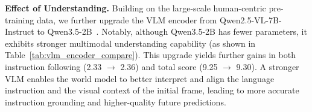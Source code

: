 \documentclass{llmxive}
\begin{document}
\textbf{Effect of Understanding.} Building on the large-scale human-centric pre-training data, we further upgrade the VLM encoder from Qwen2.5-VL-7B-Instruct to Qwen3.5-2B~\cite{qwen3.5}. Notably, although Qwen3.5-2B has fewer parameters, it exhibits stronger multimodal understanding capability (as shown in Table~\ref{tab:vlm_encoder_compare}). This upgrade yields further gains in both instruction following (2.33 $\rightarrow$ 2.36) and total score (9.25 $\rightarrow$ 9.30). A stronger VLM enables the world model to better interpret and align the language instruction and the visual context of the initial frame, leading to more accurate instruction grounding and higher-quality future predictions.

\begin{table}[t]
\centering
\begin{minipage}[t]{0.48\textwidth}
\centering
{}
\label{tab:wm_gen_ablation}
\end{minipage}
\hfill
\begin{minipage}[t]{0.48\textwidth}
\centering
{}
\label{tab:vlm_encoder_compare}
\resizebox{\textwidth}{!}{%
}
\end{minipage}
\end{table}
\end{document}
